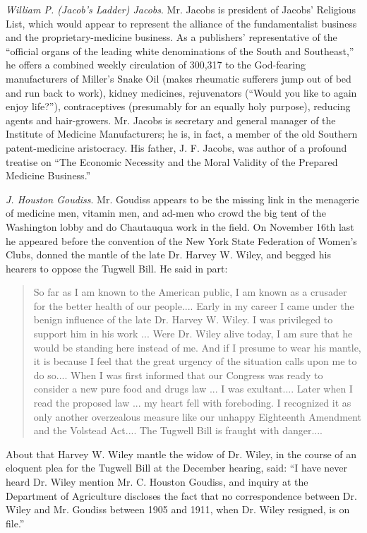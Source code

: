 \documentclass[nohyper,openany,nobib]{tufte-book}
\begin{document}
\emph{William P. (Jacob's Ladder) Jacobs}. Mr. Jacobs is president of
Jacobs' Religious List, which would appear to represent the alliance of
the fundamentalist business and the proprietary-medicine business. As a
publishers' representative of the ``official organs of the leading white
denominations of the South and Southeast,'' he offers a combined weekly
circulation of 300,317 to the God-fearing manufacturers of Miller's
Snake Oil (makes rheumatic sufferers jump out of bed and run back to
work), kidney medicines, rejuvenators (``Would you like to again enjoy
life?''), contraceptives (presumably for an equally holy purpose),
reducing agents and hair-growers. Mr. Jacobs is secretary and general
manager of the Institute of Medicine Manufacturers; he is, in fact, a
member of the old Southern patent-medicine aristocracy. His father, J.
F. Jacobs, was author of a profound treatise on ``The Economic Necessity
and the Moral Validity of the Prepared Medicine Business.''

\emph{J. Houston Goudiss}. Mr. Goudiss appears to be the missing link in
the menagerie of medicine men, vitamin men, and ad-men who crowd the big
tent of the Washington lobby and do Chautauqua work in the field. On
November 16th last he appeared before the convention of the New York
State Federation of Women's Clubs, donned the mantle of the late Dr.
Harvey W. Wiley, and begged his hearers to oppose the Tugwell Bill. He
said in part:

\begin{quote}
So far as I am known to the American public, I am known as a crusader
for the better health of our people.... Early in my career I came under
the benign influence of the late Dr. Harvey W. Wiley. I was privileged
to support him in his work ... Were Dr. Wiley alive today, I am sure
that he would be standing here instead of me. And if I presume to wear
his mantle, it is because I feel that the great urgency of the situation
calls upon me to do so.... When I was first informed that our Congress
was ready to consider a new pure food and drugs law ... I was
exultant.... Later when I read the proposed law ... my heart fell with
foreboding. I recognized it as only another overzealous measure like our
unhappy Eighteenth Amendment and the Volstead Act.... The Tugwell Bill
is fraught with danger....
\end{quote}

About that Harvey W. Wiley mantle the widow of Dr. Wiley, in the course
of an eloquent plea for the Tugwell Bill at the December hearing, said:
``I have never heard Dr. Wiley mention Mr. C. Houston Goudiss, and
inquiry at the Department of Agriculture discloses the fact that no
correspondence between Dr. Wiley and Mr. Goudiss between 1905 and 1911,
when Dr. Wiley resigned, is on file.''
\end{document}
